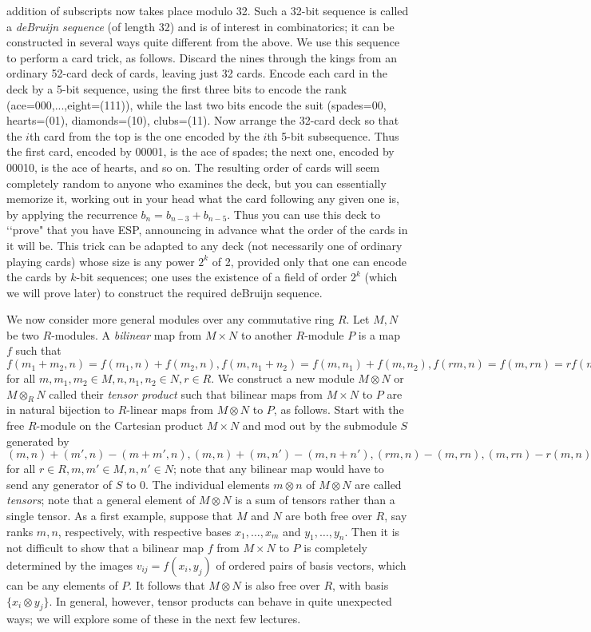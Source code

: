 \documentclass[10pt]{article}
\begin{document}
addition of subscripts now takes place modulo 32. Such a 32-bit sequence
is called a {\sl deBruijn sequence} (of length 32) and is of interest in
combinatorics; it can be constructed in several ways quite different
from the above. We use this sequence to perform a card trick, as
follows. Discard the nines through the kings from an ordinary 52-card
deck of cards, leaving just 32 cards. Encode each card in the deck by a
5-bit sequence, using the first three bits to encode the rank
(ace=000,...,eight=(111)), while the last two bits encode the suit
(spades=00, hearts=(01), diamonds=(10), clubs=(11). Now arrange the
32-card deck so that the $i$th card from the top is the one encoded by
the $i$th 5-bit subsequence. Thus the first card, encoded by 00001, is
the ace of spades; the next one, encoded by 00010, is the ace of hearts,
and so on. The resulting order of cards will seem completely random to
anyone who examines the deck, but you can essentially memorize it,
working out in your head what the card following any given one is, by
applying the recurrence $b_n = b_{n-3} + b_{n-5}$. Thus you can use this
deck to \lq\lq prove" that you have ESP, announcing in advance what the
order of the cards in it will be. This trick can be adapted to any deck
(not necessarily one of ordinary playing cards) whose size is any power
$2^k$ of 2, provided only that one can encode the cards by $k$-bit
sequences; one uses the existence of a field of order $2^k$ (which we
will prove later) to construct the required deBruijn sequence.

We now consider more general modules over any commutative ring $R$. Let
$M,N$ be two $R$-modules. A {\sl bilinear} map from $M\times N$ to
another $R$-module $P$ is a map $f$ such that $f(m_1+m_2,n) =
f(m_1,n)+f(m_2,n), f(m,n_1+n_2) = f(m,n_1)+f(m,n_2), f(rm,n) = f(m,rn) =
rf(m,n)$ for all $m,m_1,m_2\in M, n,n_1,n_2\in N, r\in R$. We construct
a new module $M\otimes N$ or $M\otimes_R N$ called their {\sl tensor
  product} such that bilinear maps from $M\times N$ to $P$ are in
natural bijection to $R$-linear maps from $M\otimes N$ to $P$, as
follows. Start with the free $R$-module on the Cartesian product
$M\times N$ and mod out by the submodule $S$ generated by $(m,n) +
(m',n) - (m+m',n), (m,n) + (m,n') - (m,n+n'), (rm,n) - (m,rn),(m,rn) -
r(m,n)$ for all $r\in R,m,m'\in M, n,n'\in N$; note that any bilinear
map would have to send any generator of $S$ to 0. The individual
elements $m\otimes n$ of $M\otimes N$ are called {\sl tensors}; note
that a general element of $M\otimes N$ is a sum of tensors rather than a
single tensor. As a first example, suppose that $M$ and $N$ are both
free over $R$, say ranks $m,n$, respectively, with respective bases
$x_1,\ldots,x_m$ and $y_1,\ldots,y_n$. Then it is not difficult to show
that a bilinear map $f$ from $M\times N$ to $P$ is completely determined
by the images $v_{ij}=f(x_i,y_j)$ of ordered pairs of basis vectors,
which can be any elements of $P$. It follows that $M\otimes N$ is also
free over $R$, with basis $\{x_ i\otimes y_j\}$. In general, however,
tensor products can behave in quite unexpected ways; we will explore
some of these in the next few lectures.
\end{document}
